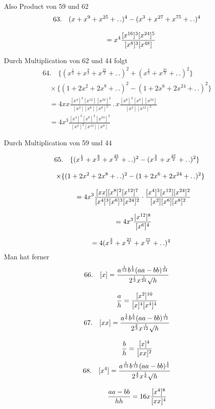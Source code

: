 Also Product von 59 und 62
\[
\begin{gathered}63.\quad{}
(x+x^9+x^{25}+\mathinner{.\,.})^4-(x^3+x^{27}+x^{75}+\mathinner{.\,.})^4
\\[8pt]\quad{}=x^4\frac{[x^{16}]^3[x^{24}]^5}{[x^8]^3[x^{48}]}\end{gathered}
\]

Durch Multiplication von 62 und 44 folgt
\[
\begin{gathered}
64.\quad{}
\{(x^{\frac12}+x^{\frac92}+x^{\frac{25}2}+ .\,. )^2+(x^{\frac32}+x^{\frac{27}2}+ .\,. )^2\}\\[8pt]
\quad\times\{(1+2x^2+2x^8+ .\,. )^2-(1+2x^6+2x^{24}+ .\,. )^2\}\\[8pt]
\quad=4xx\frac{[x^4]^3[x^{12}][x^{24}]^2}{[x^2][x^6][x^8]^2}\,.\,x\frac{[x^6]^3[x^8][x^{24}]}{[x^2][x^{12}]^2}
\\[8pt]\quad{}=4x^3\frac{[x^4]^3[x^6]^2[x^{24}]^3}{[x^2]^2[x^{12}][x^8]}
\end{gathered}
\]

Durch Multiplication von 59 und 44


\[
\begin{gathered}
65.\quad{}
\{(x^{\frac12}+x^{\frac92}+x^{\frac{25}2}+\mathinner{.\,.})^2
 -(x^{\frac32}+x^{\frac{27}2}+\mathinner{.\,.})^2\}\\[8pt]
\quad\times\{(1+2x^2+2x^8+\mathinner{.\,.})^2
 -(1+2x^6+2x^{24}+\mathinner{.\,.})^2\}\\[8pt]
\qquad=4x^3\frac{[xx][x^8]^2[x^{12}]^7}{[x^4]^3[x^6]^3[x^{24}]^2}
 \cdot\frac{[x^4]^3[x^{12}][x^{24}]^2}{[x^2][x^6][x^8]^2}\\[8pt]
\qquad=4x^3\frac{[x^{12}]^8}{[x^6]^4}
 \\[8pt]\quad{}=4(x^{\frac32}+x^{\frac{27}2}+x^{\frac{75}2}+\mathinner{.\,.})^4
\end{gathered}
\]
Man hat ferner
\[
\begin{gathered}66.\quad{}
[x]=\frac{a^{\frac1{12}}b^{\frac13}(aa-bb)^{\frac1{24}}}
 {2^{\frac13}x^{\frac1{24}}\mathord{\surd}h}
\\[8pt]\quad{}\qquad
\frac ah=\frac{[x^2]^{10}}{[x]^4[x^4]^4}\end{gathered}
\]
\[
\begin{gathered}67.\quad{}
[xx]=\frac{a^{\frac16}b^{\frac16}(aa-bb)^{\frac1{12}}}
 {2^{\frac23}x^{\frac1{12}}\mathord{\surd}h}
\\[8pt]\quad{}\qquad
\frac bh=\frac{[x]^4}{[xx]^2}\end{gathered}
\]
\[
\begin{gathered}68.\quad{}
[x^4]=\frac{a^{\frac1{12}}b^{\frac1{12}}(aa-bb)^{\frac16}}
 {2^{\frac43}x^{\frac16}\mathord{\surd}h}
\\[8pt]\quad{}\qquad
\frac{aa-bb}{hh}=16x\frac{[x^4]^8}{[xx]^4}\end{gathered}
\]

